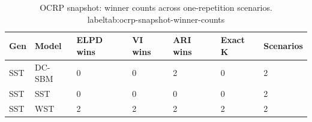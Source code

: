 \begin{table}[!h]
\centering
\caption{OCRP snapshot: winner counts across one-repetition scenarios.\\label{tab:ocrp-snapshot-winner-counts}}
\centering
\begin{tabular}[t]{lllllll}
\toprule
Gen & Model & ELPD wins & VI wins & ARI wins & Exact K & Scenarios\\
\midrule
SST & DC-SBM & 0 & 0 & 2 & 0 & 2\\
SST & SST & 0 & 0 & 0 & 0 & 2\\
SST & WST & 2 & 2 & 2 & 2 & 2\\
\bottomrule
\end{tabular}
\end{table}
